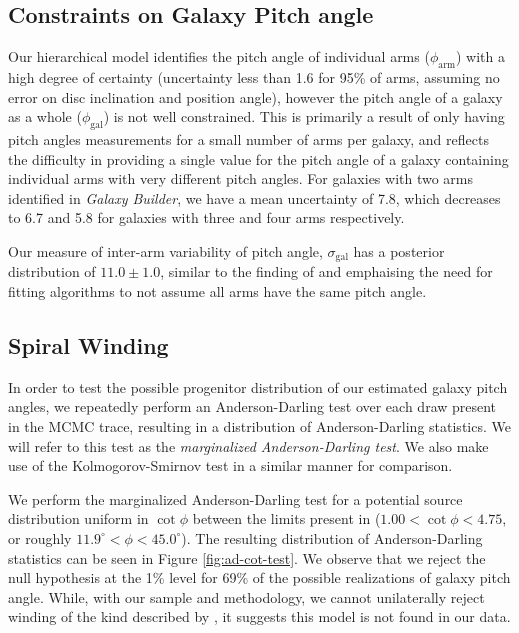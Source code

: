 \subsection{Constraints on Galaxy Pitch angle}
Our hierarchical model identifies the pitch angle of individual arms ($\phi_\mathrm{arm}$) with a high degree of certainty (uncertainty less than {1.6\degree} for 95\% of arms, assuming no error on disc inclination and position angle), however the pitch angle of a galaxy as a whole ($\phi_\mathrm{gal}$) is not well constrained. This is primarily a result of only having pitch angles measurements for a small number of arms per galaxy, and reflects the difficulty in providing a single value for the pitch angle of a galaxy containing individual arms with very different pitch angles. For galaxies with two arms identified in \textit{Galaxy Builder}, we have a mean uncertainty of {7.8\degree}, which decreases to {6.7\degree} and {5.8\degree} for galaxies with three and four arms respectively.

Our measure of inter-arm variability of pitch angle, $\sigma_\mathrm{gal}$ has a posterior distribution of $11.0\pm 1.0$, similar to the finding of \citet{2014ApJ...790...87D} and emphaising the need for fitting algorithms to not assume all arms have the same pitch angle.

\subsection{Spiral Winding}
\label{section:spiral_winding}
In order to test the possible progenitor distribution of our estimated galaxy pitch angles, we repeatedly perform an Anderson-Darling test over each draw present in the MCMC trace, resulting in a distribution of Anderson-Darling statistics. We will refer to this test as the \textit{marginalized Anderson-Darling test}. We also make use of the Kolmogorov-Smirnov test in a similar manner for comparison.

We perform the marginalized Anderson-Darling test for a potential source distribution uniform in $\cot\phi$ between the limits present in \citet{2019arXiv190910291P} ($1.00 < \cot\phi < 4.75$, or roughly $11.9^\circ < \phi < 45.0^\circ$). The resulting distribution of Anderson-Darling statistics can be seen in Figure \ref{fig:ad-cot-test}. We observe that we reject the null hypothesis at the 1\% level for 69\% of the possible realizations of galaxy pitch angle. While, with our sample and methodology, we cannot unilaterally reject winding of the kind described by \citet{2019arXiv190910291P}, it suggests this model is not found in our data.

